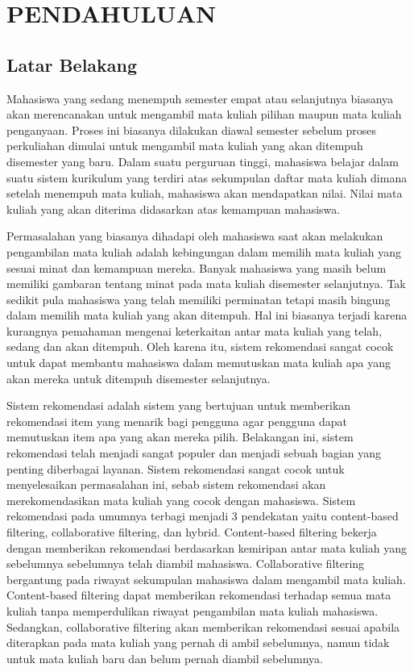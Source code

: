 \section{PENDAHULUAN}

\subsection{Latar Belakang}

Mahasiswa yang sedang menempuh semester empat atau selanjutnya biasanya akan merencanakan untuk mengambil
mata kuliah pilihan maupun mata kuliah penganyaan. Proses ini biasanya dilakukan diawal semester sebelum proses perkuliahan
dimulai untuk mengambil mata kuliah yang akan ditempuh disemester yang baru. Dalam suatu perguruan tinggi, mahasiswa belajar dalam suatu
sistem kurikulum yang terdiri atas sekumpulan daftar mata kuliah dimana setelah menempuh mata kuliah,
mahasiswa akan mendapatkan nilai. Nilai mata kuliah yang akan diterima didasarkan atas kemampuan
mahasiswa.

Permasalahan yang biasanya dihadapi oleh mahasiswa saat akan melakukan pengambilan mata kuliah adalah kebingungan dalam
memilih mata kuliah yang sesuai minat dan kemampuan mereka. Banyak mahasiswa yang masih belum memiliki gambaran tentang
minat pada mata kuliah disemester selanjutnya. Tak sedikit pula mahasiswa yang telah memiliki perminatan tetapi masih
bingung dalam memilih mata kuliah yang akan ditempuh. Hal ini biasanya terjadi karena kurangnya pemahaman mengenai
keterkaitan antar mata kuliah yang telah, sedang dan akan ditempuh. Oleh karena itu, sistem rekomendasi sangat cocok untuk
dapat membantu mahasiswa dalam memutuskan mata kuliah apa yang akan mereka untuk ditempuh disemester selanjutnya.

Sistem rekomendasi adalah sistem yang bertujuan untuk memberikan rekomendasi item yang menarik bagi pengguna agar pengguna
dapat memutuskan item apa yang akan mereka pilih. Belakangan ini, sistem rekomendasi telah menjadi sangat populer dan menjadi
sebuah bagian yang penting diberbagai layanan. Sistem rekomendasi sangat cocok untuk menyelesaikan permasalahan ini, sebab
sistem rekomendasi akan merekomendasikan mata kuliah yang cocok dengan mahasiswa. Sistem rekomendasi pada umumnya terbagi
menjadi 3 pendekatan yaitu content-based filtering, collaborative filtering, dan hybrid. Content-based filtering bekerja
dengan memberikan rekomendasi berdasarkan kemiripan antar mata kuliah yang sebelumnya sebelumnya telah diambil mahasiswa.
Collaborative filtering bergantung pada riwayat sekumpulan mahasiswa dalam mengambil mata kuliah. Content-based filtering
dapat memberikan rekomendasi terhadap semua mata kuliah tanpa memperdulikan riwayat pengambilan mata kuliah mahasiswa.
Sedangkan, collaborative filtering akan memberikan rekomendasi sesuai apabila diterapkan pada mata kuliah yang pernah di
ambil sebelumnya, namun tidak untuk mata kuliah baru dan belum pernah diambil sebelumnya.

